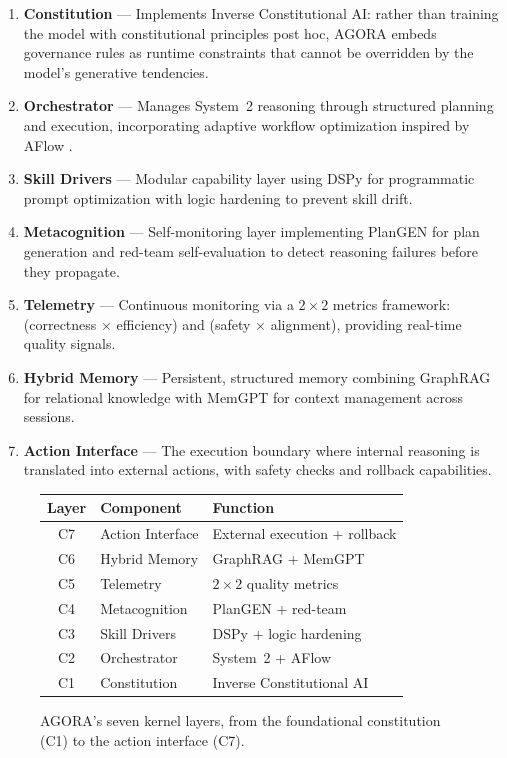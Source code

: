 \documentclass[11pt,a4paper]{article}
\begin{document}
\begin{enumerate}[label=\textbf{C\arabic*}]
    \item \textbf{Constitution} --- Implements Inverse Constitutional AI: rather than training the model with constitutional principles post hoc, AGORA embeds governance rules as runtime constraints that cannot be overridden by the model's generative tendencies.

    \item \textbf{Orchestrator} --- Manages System~2 reasoning through structured planning and execution, incorporating adaptive workflow optimization inspired by AFlow \citep{chen2024aflow}.

    \item \textbf{Skill Drivers} --- Modular capability layer using DSPy \citep{khattab2023dspy} for programmatic prompt optimization with logic hardening to prevent skill drift.

    \item \textbf{Metacognition} --- Self-monitoring layer implementing PlanGEN \citep{sun2024plangen} for plan generation and red-team self-evaluation to detect reasoning failures before they propagate.

    \item \textbf{Telemetry} --- Continuous monitoring via a $2 \times 2$ metrics framework: (correctness $\times$ efficiency) and (safety $\times$ alignment), providing real-time quality signals.

    \item \textbf{Hybrid Memory} --- Persistent, structured memory combining GraphRAG \citep{edge2024graphrag} for relational knowledge with MemGPT \citep{packer2023memgpt} for context management across sessions.

    \item \textbf{Action Interface} --- The execution boundary where internal reasoning is translated into external actions, with safety checks and rollback capabilities.
\end{enumerate}

\begin{figure}[ht]
\centering
\begin{tabular}{|c|l|l|}
\hline
\textbf{Layer} & \textbf{Component} & \textbf{Function} \\
\hline
C7 & Action Interface & External execution + rollback \\
C6 & Hybrid Memory & GraphRAG + MemGPT \\
C5 & Telemetry & $2\times 2$ quality metrics \\
C4 & Metacognition & PlanGEN + red-team \\
C3 & Skill Drivers & DSPy + logic hardening \\
C2 & Orchestrator & System~2 + AFlow \\
C1 & Constitution & Inverse Constitutional AI \\
\hline
\end{tabular}
\caption{AGORA's seven kernel layers, from the foundational constitution (C1) to the action interface (C7).}
\label{fig:agora_layers}
\end{figure}
\end{document}

